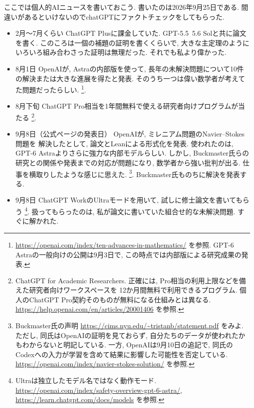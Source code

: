 \documentclass[dvipdfmx,a4paper,11pt]{article} %
\theoremstyle{definition}
\numberwithin{equation}{section}
\begin{document}
ここでは個人的AIニュースを書いておこう. 書いたのは2026年9月25日である. 
間違いがあるといけないのでchatGPTにファクトチェックをしてもらった. 
\begin{itemize}
  \item
2月〜7月くらい\quad
  ChatGPT Plusに課金していた. GPT-5.5~5.6 Solと共に論文を書く.
  このころは一個の補題の証明を書くくらいで,
  大きな主定理のようにいろいろ組み合わさった証明は無理だった.
  それでも私より偉かった.

  \item
8月1日
\quad
  OpenAIが, Astraの内部版を使って,
  長年の未解決問題について10件の解決または大きな進展を得たと発表.
  そのうち一つは偉い数学者が考えてた問題だったらしい.
  \footnote{\url{https://openai.com/index/ten-advances-in-mathematics/}
  を参照. GPT-6 Astraの一般向けの公開は9月3日で,
  この時点では内部版による研究成果の発表.}.

  \item
8月下旬
\quad
  ChatGPT Pro相当を1年間無料で使える研究者向けプログラムが当たる%
  \footnote{ChatGPT for Academic Researchers.
  正確には, Pro相当の利用上限などを備えた研究者向けワークスペースを
  12か月間無料で利用できるプログラム.
  個人のChatGPT Pro契約そのものが無料になる仕組みとは異なる.
  \url{https://help.openai.com/en/articles/20001406} を参照.}.


  \item
9月8日（公式ページの発表日）
OpenAIが, ミレニアム問題のNavier--Stokes問題を
  解決したとして, 論文とLeanによる形式化を発表.
  使われたのは, GPT-6 Astraよりさらに強力な内部モデルらしい.
  しかし, Buckmaster氏らの研究との関係や発表までの対応が問題になり,
  数学者から強い批判が出る.
  仕事を横取りしたような感じに思えた.%
  \footnote{Buckmaster氏の声明
  \url{https://cims.nyu.edu/~tristanb/statement.pdf} をみよ.
  ただし, 同氏はOpenAIの証明を見ておらず,
  自分たちのデータが使われたかもわからないと明記している.
  一方, OpenAIは9月10日の追記で,
  同氏のCodexへの入力が学習を含めて結果に影響した可能性を否定している.
  \url{https://openai.com/index/navier-stokes-solution/} を参照.}.
    Buckmaster氏ものちに解決を発表する. 
    
  \item
9月8日
\quad
  ChatGPT WorkのUltraモードを用いて,
  試しに修士論文を書いてもらう%
  \footnote{Ultraは独立したモデル名ではなく動作モード.
  \url{https://openai.com/index/safety-overview-gpt-6-astra/},
  \url{https://learn.chatgpt.com/docs/models} を参照.}.
  扱ってもらったのは, 私が論文に書いていた組合せ的な未解決問題.
  すぐに解かれた.


\end{itemize}
\end{document}

